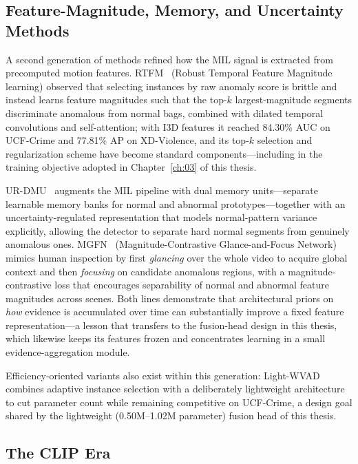 \subsection{Feature-Magnitude, Memory, and Uncertainty Methods}

A second generation of methods refined how the MIL signal is extracted from precomputed motion
features. RTFM~\cite{tian2021rtfm} (Robust Temporal Feature Magnitude learning) observed that
selecting instances by raw anomaly score is brittle and instead learns feature magnitudes such
that the top-$k$ largest-magnitude segments discriminate anomalous from normal bags, combined
with dilated temporal convolutions and self-attention; with I3D features it reached 84.30\% AUC on
UCF-Crime and 77.81\% AP on XD-Violence, and its top-$k$ selection and regularization scheme have
become standard components---including in the training objective adopted in
Chapter~\ref{ch:03} of this thesis.

UR-DMU~\cite{zhou2023urdmu} augments the MIL pipeline with dual memory units---separate learnable
memory banks for normal and abnormal prototypes---together with an uncertainty-regulated
representation that models normal-pattern variance explicitly, allowing the detector to separate
hard normal segments from genuinely anomalous ones. MGFN~\cite{chen2023mgfn} (Magnitude-Contrastive
Glance-and-Focus Network) mimics human inspection by first \emph{glancing} over the whole video to
acquire global context and then \emph{focusing} on candidate anomalous regions, with a
magnitude-contrastive loss that encourages separability of normal and abnormal feature magnitudes
across scenes. Both lines demonstrate that architectural priors on \emph{how} evidence is
accumulated over time can substantially improve a fixed feature representation---a lesson that
transfers to the fusion-head design in this thesis, which likewise keeps its features frozen and
concentrates learning in a small evidence-aggregation module.

Efficiency-oriented variants also exist within this generation:
Light-WVAD~\cite{wang2024lightwvad} combines adaptive instance selection with a deliberately
lightweight architecture to cut parameter count while remaining competitive on UCF-Crime,
a design goal shared by the lightweight (0.50M--1.02M parameter) fusion head of this thesis.

\subsection{The CLIP Era}


